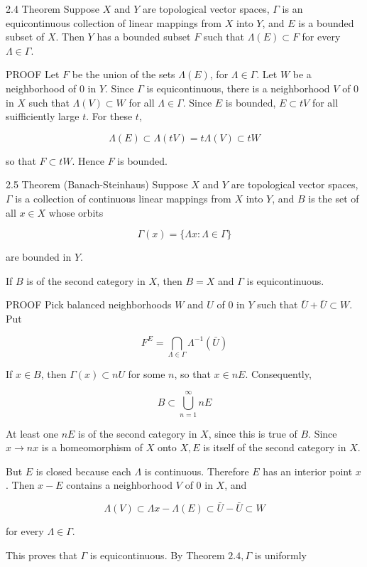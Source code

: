\documentclass[10pt]{article}
\begin{document}
2.4 Theorem Suppose $X$ and $Y$ are topological vector spaces, $\Gamma$ is an equicontinuous collection of linear mappings from $X$ into $Y$, and $E$ is a bounded subset of $X$. Then $Y$ has a bounded subset $F$ such that $\Lambda(E) \subset F$ for every $\Lambda \in \Gamma$.

PROOF Let $F$ be the union of the sets $\Lambda(E)$, for $\Lambda \in \Gamma$. Let $W$ be a neighborhood of 0 in $Y$. Since $\Gamma$ is equicontinuous, there is a neighborhood $V$ of 0 in $X$ such that $\Lambda(V) \subset W$ for all $\Lambda \in \Gamma$. Since $E$ is bounded, $E \subset t V$ for all suifficiently large $t$. For these $t$,

$$
\Lambda(E) \subset \Lambda(t V)=t \Lambda(V) \subset t W
$$

so that $F \subset t W$. Hence $F$ is bounded.

2.5 Theorem (Banach-Steinhaus) Suppose $X$ and $Y$ are topological vector spaces, $\Gamma$ is a collection of continuous linear mappings from $X$ into $Y$, and $B$ is the set of all $x \in X$ whose orbits

$$
\Gamma(x)=\{\Lambda x: \Lambda \in \Gamma\}
$$

are bounded in $Y$.

If $B$ is of the second category in $X$, then $B=X$ and $\Gamma$ is equicontinuous.

PROOF Pick balanced neighborhoods $W$ and $U$ of 0 in $Y$ such that $\bar{U}+\bar{U} \subset W$. Put

$$
F^{E}=\bigcap_{\Lambda \in \Gamma} \Lambda^{-1}(\bar{U})
$$

If $x \in B$, then $\Gamma(x) \subset n U$ for some $n$, so that $x \in n E$. Consequently,

$$
B \subset \bigcup_{n=1}^{\infty} n E
$$

At least one $n E$ is of the second category in $X$, since this is true of $B$. Since $x \rightarrow n x$ is a homeomorphism of $X$ onto $X, E$ is itself of the second category in $X$.

But $E$ is closed because each $\Lambda$ is continuous. Therefore $E$ has an interior point $x$. Then $x-E$ contains a neighborhood $V$ of 0 in $X$, and

$$
\Lambda(V) \subset \Lambda x-\Lambda(E) \subset \bar{U}-\bar{U} \subset W
$$

for every $\Lambda \in \Gamma$.

This proves that $\Gamma$ is equicontinuous. By Theorem $2.4, \Gamma$ is uniformly
\end{document}
